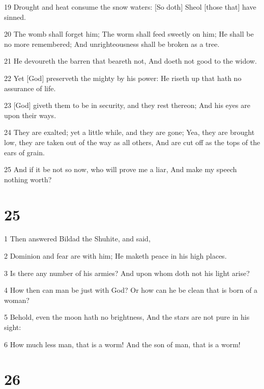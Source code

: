 \par 19 Drought and heat consume the snow waters: [So doth] Sheol [those that] have sinned.
\par 20 The womb shall forget him; The worm shall feed sweetly on him; He shall be no more remembered; And unrighteousness shall be broken as a tree.
\par 21 He devoureth the barren that beareth not, And doeth not good to the widow.
\par 22 Yet [God] preserveth the mighty by his power: He riseth up that hath no assurance of life.
\par 23 [God] giveth them to be in security, and they rest thereon; And his eyes are upon their ways.
\par 24 They are exalted; yet a little while, and they are gone; Yea, they are brought low, they are taken out of the way as all others, And are cut off as the tops of the ears of grain.
\par 25 And if it be not so now, who will prove me a liar, And make my speech nothing worth?

\chapter{25}

\par 1 Then answered Bildad the Shuhite, and said,
\par 2 Dominion and fear are with him; He maketh peace in his high places.
\par 3 Is there any number of his armies? And upon whom doth not his light arise?
\par 4 How then can man be just with God? Or how can he be clean that is born of a woman?
\par 5 Behold, even the moon hath no brightness, And the stars are not pure in his sight:
\par 6 How much less man, that is a worm! And the son of man, that is a worm!

\chapter{26}

